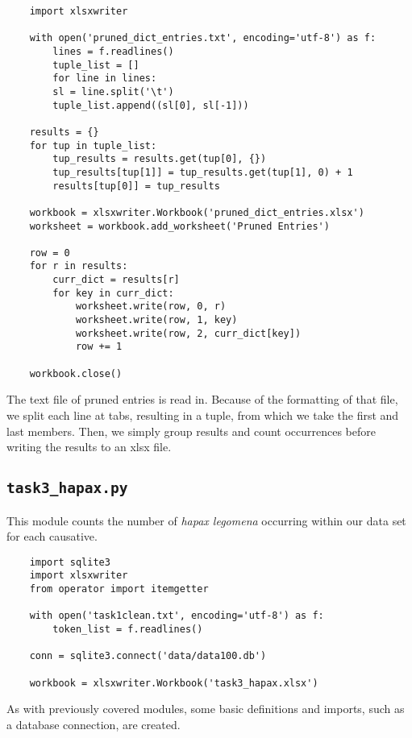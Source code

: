\documentclass{article}      %
\begin{document}
	\begin{verbatim}
	import xlsxwriter
	
	with open('pruned_dict_entries.txt', encoding='utf-8') as f:
		lines = f.readlines()
		tuple_list = []
		for line in lines:
		sl = line.split('\t')
		tuple_list.append((sl[0], sl[-1]))
	
	results = {}
	for tup in tuple_list:
		tup_results = results.get(tup[0], {})
		tup_results[tup[1]] = tup_results.get(tup[1], 0) + 1
		results[tup[0]] = tup_results
	
	workbook = xlsxwriter.Workbook('pruned_dict_entries.xlsx')
	worksheet = workbook.add_worksheet('Pruned Entries')
	
	row = 0
	for r in results:
		curr_dict = results[r]
		for key in curr_dict:
			worksheet.write(row, 0, r)
			worksheet.write(row, 1, key)
			worksheet.write(row, 2, curr_dict[key])
			row += 1
	
	workbook.close()
	\end{verbatim}
	
	The text file of pruned entries is read in. Because of the formatting of that file, we split each line at tabs, resulting in a tuple, from which we take the first and last members. Then, we simply group results and count occurrences before writing the results to an xlsx file.
	
	\subsection{\texttt{task3\_hapax.py}}
	
	This module counts the number of \emph{hapax legomena} occurring within our data set for each causative.
	
	\begin{verbatim}
	import sqlite3
	import xlsxwriter
	from operator import itemgetter
	
	with open('task1clean.txt', encoding='utf-8') as f:
		token_list = f.readlines()
	
	conn = sqlite3.connect('data/data100.db')
	
	workbook = xlsxwriter.Workbook('task3_hapax.xlsx')
	\end{verbatim}
	
	As with previously covered modules, some basic definitions and imports, such as a database connection, are created.
	
\end{document}
